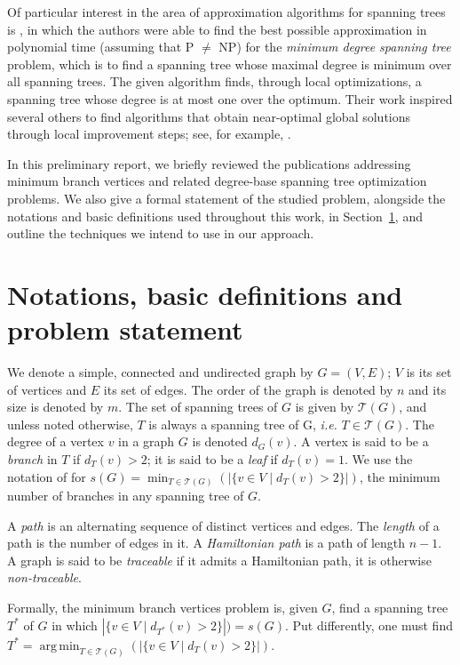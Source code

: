 \documentclass[12pt]{article}
\DeclareMathOperator*{\argmin}{arg\,min}
\begin{document}
Of particular interest in the area of approximation algorithms for spanning trees is \cite{furer1992}, in which the authors were able to find the best possible approximation in polynomial time (assuming that P $\neq$ NP) for the \emph{minimum degree spanning tree} problem, which is to find a spanning tree whose maximal degree is minimum over all spanning trees.
The given algorithm finds, through local optimizations, a spanning tree whose degree is at most one over the optimum. 
Their work inspired several others to find algorithms that obtain near-optimal global solutions through local improvement steps; see, for example, \cite{salamon2010, lu1996, chimani2015}.

In this preliminary report, we briefly reviewed the publications addressing minimum branch vertices and related degree-base spanning tree optimization problems.
We also give a formal statement of the studied problem, alongside the notations and basic definitions used throughout this work, in Section~\ref{sec:notations}, and outline the techniques we intend to use in our approach.

\section{Notations, basic definitions and problem statement} \label{sec:notations}

We denote a simple, connected and undirected graph by $G = (V, E)$; $V$ is its set of vertices and $E$ its set of edges.
The order of the graph is denoted by $n$ and its size is denoted by $m$.
The set of spanning trees of $G$ is given by $\mathcal{T}(G)$, and unless noted otherwise, $T$ is always a spanning tree of G, \emph{i.e.} $T \in \mathcal{T}(G)$.
The degree of a vertex $v$ in a graph $G$ is denoted $d_G(v)$.
A vertex is said to be a \emph{branch} in $T$ if $d_T(v) > 2$; it is said to be a \emph{leaf} if $d_T(v) = 1$.
We use the notation of \cite{gargano2004} for $s(G) = \min_{T \in \mathcal{T}(G)}(|\{v \in V \mid d_T(v) > 2 \}|)$, the minimum number of branches in any spanning tree of $G$.

A \emph{path} is an alternating sequence of distinct vertices and edges.
The \emph{length} of a path is the number of edges in it.
A \emph{Hamiltonian path} is a path of length $n - 1$.
A graph is said to be \emph{traceable} if it admits a Hamiltonian path, it is otherwise \emph{non-traceable}.

Formally, the minimum branch vertices problem is, given $G$, find a spanning tree $T^*$ of $G$ in which $|\{v \in V \mid d_{T^*}(v) > 2 \}|) = s(G)$.
Put differently, one must find $T^* = \argmin_{T \in \mathcal{T}(G)}(|\{ v \in V \mid d_T(v) > 2\}|)$.
\end{document}
